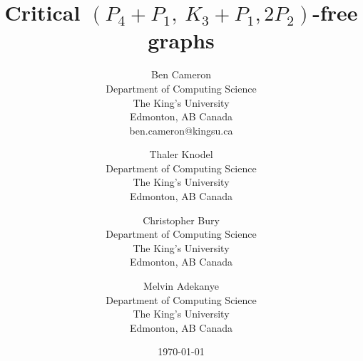 \documentclass[11pt]{article}
\theoremstyle{definition}
\newcommand{\forbid}{$(P_4+P_1,\ K_3+P_1,2P_2)$}
\begin{document}
\title{Critical \forbid -free graphs}
\author{
Ben Cameron\\ %
\small Department of Computing Science\\
\small The King's University\\
\small Edmonton, AB Canada\\
\small ben.cameron@kingsu.ca\\
\and
Thaler Knodel\\ %
\small Department of Computing Science\\
\small The King's University\\
\small Edmonton, AB Canada\\
\and
Christopher Bury\\ %
\small Department of Computing Science\\
\small The King's University\\
\small Edmonton, AB Canada\\
\and
Melvin Adekanye\\
\small Department of Computing Science\\
\small The King's University\\
\small Edmonton, AB Canada\\
}

\date{\today}

\maketitle


\begin{abstract}
\end{abstract}
\end{document}
